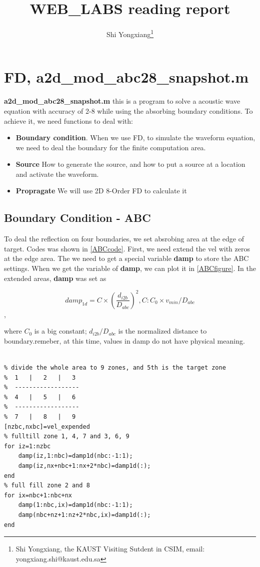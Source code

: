 \documentclass[a4paper]{article}
\author{Shi Yongxiang\footnote{Shi Yongxiang, the KAUST Visiting Sutdent in CSIM, email: yongxiang.shi@kaust.edu.sa}}
\title{WEB\_LABS reading report}
\begin{document}
	
	\maketitle

\section{FD, a2d\_mod\_abc28\_snapshot.m}
	\textbf{a2d\_mod\_abc28\_snapshot.m}
	this is a program to solve a acoustic wave equation with accuracy of 2-8 while using the absorbing boundary conditions. To achieve it, we need functions to deal with:

	\begin{itemize}
		\item[1] \textbf{Boundary condition}. When we use FD, to simulate the waveform equation, we need to deal the boundary for the finite computation area.
		\item[2] \textbf{Source} How to generate the source, and how to put a source at a location and activate the waveform.
		\item[3] \textbf{Propragate} We will use 2D 8-Order FD to calculate it
	\end{itemize}

	\subsection{Boundary Condition - ABC}
		 To deal the reflection on four boundaries, we set absrobing area at the edge of target. Codes was shown in \autoref{ABCcode}. 
		 First, we need extend the vel with zeros at the edge area. The we need to get a special variable \textbf{damp} to store the ABC settings. 
		 When we get the variable of \textbf{damp}, we can plot it in \autoref{ABCfigure}. 
		 In the extended areas, \textbf{damp} was set as

		 $$damp_{1d}=C\times(\frac{d_{i2b}}{D_{abc}})^2,C: C_0\times v_{min}/D_{abc}$$,

		 where $C_0$ is a big constant; $d_{i2b}/D_{abc}$ is the normalized distance to boundary.remeber, at this time, values in damp do not have physical meaning.

		\begin{lstlisting}[caption=set ABC to the velocity variable (2 is same), label=ABCcode]

% divide the whole area to 9 zones, and 5th is the target zone
%  1   |   2   |   3
%  ------------------
%  4   |   5   |   6
%  ------------------
%  7   |   8   |   9
[nzbc,nxbc]=vel_expended
% fulltill zone 1, 4, 7 and 3, 6, 9
for iz=1:nzbc
    damp(iz,1:nbc)=damp1d(nbc:-1:1);
    damp(iz,nx+nbc+1:nx+2*nbc)=damp1d(:);
end
% full fill zone 2 and 8
for ix=nbc+1:nbc+nx
    damp(1:nbc,ix)=damp1d(nbc:-1:1);
    damp(nbc+nz+1:nz+2*nbc,ix)=damp1d(:);
end
	    \end{lstlisting}
\end{document}
